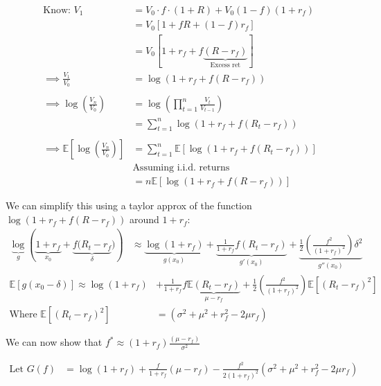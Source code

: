 \documentclass[
  oneside]{book}
\begin{document}
\[
\begin{aligned}
\text{Know: }V_{1} &= V_{0}\cdot f\cdot(1+R) + V_{0}(1-f)(1+r_{f})\\
&= V_{0}[1+fR+(1-f)r_{f}]\\
&= V_{0}[1+r_{f}+f\underbrace{ (R-r_{f}) }_{ \text{Excess ret} }]\\
\implies \frac{V_{1}}{V_{0}} &= \log(1+r_{f}+f(R-r_{f}))\\
\\
\implies \log \left( \frac{V_{n}}{V_{0}} \right) &=  \log \left( \prod^{n}_{t=1} \frac{V_{t}}{V_{t-1}} \right) \\
&= \sum^{n}_{t=1} \log(1+r_{f}+f(R_{t}-r_{f}))\\
\\
\implies \mathbb{E}\left[ \log\left( \frac{V_{n}}{V_{0}} \right) \right] &= \sum^{n}_{t=1}\mathbb{E}[\log(1+r_{f}+f(R_{t}-r_{f}))]\\
& \text{Assuming i.i.d. returns}\\
&= n \mathbb{E}[\log(1+r_{f}+f(R-r_{f}))]
\end{aligned}
\]

We can simplify this using a taylor approx of the function \(\log(1+r_{f}+f(R-r_{f}))\) around \(1+r_{f}\):
\[
\begin{aligned}
\underbrace{ \log }_{ g } \left( \underbrace{ 1+r_{f} }_{ x_{0} }+\underbrace{ f(R_{t}-r_{f} }_{ \delta }) \right) &\approx \underbrace{ \log(1+r_{f}) }_{ g(x_{0}) } + \underbrace{ \frac{1}{1+r_{f}}f(R_{t}-r_{f}) }_{ g'(x_{0}) }+\underbrace{ \frac{1}{2}\left( \frac{f^{2}}{(1+r_{f})^{2}}\right)\delta^{2} }_{ g''(x_{0}) }
\end{aligned}
\]
\[
\begin{aligned}
\mathbb{E}[g(x_{0}-\delta)] \approx \log(1+r_{f}) &+ \frac{1}{1+r_{f}}f\underbrace{ \mathbb{E}(R_{t}-r_{f}) }_{ \mu-r_{f} }+\frac{1}{2}\left( \frac{f^{2}}{(1+r_{f})^{2}}\right)\mathbb{E}[(R_{t}-r_{f})^{2}]\\
\text{Where } \mathbb{E}[(R_{t}-r_{f})^{2}] &= (\sigma^{2}+\mu^{2}+r_{f}^{2}-2\mu r_{f})
\end{aligned}
\]

We can now show that \(f^{*} \approx (1+r_{f}) \frac{(\mu-r_{f})}{\sigma^{2}}\)

\[
\begin{aligned}
\text{Let } G(f) &= \log(1+r_{f})+\frac{f}{1+r_{f}}(\mu-r_{f})-\frac{f^{2}}{2(1+r_{f})^{2}}(\sigma^{2}+\mu^{2}+r_{f}^{2}-2\mu r_{f})
\end{aligned}
\]
\end{document}
